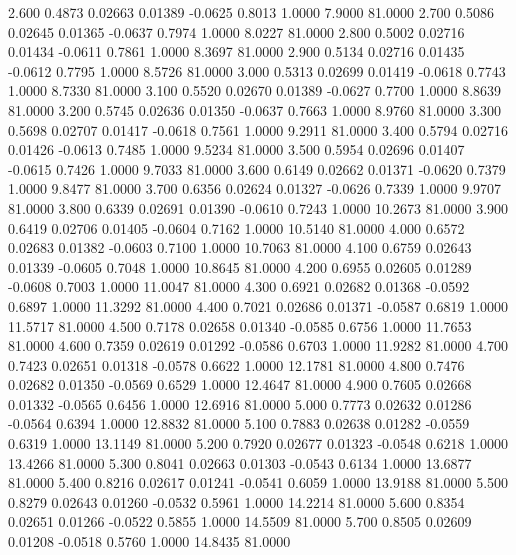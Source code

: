   2.600   0.4873   0.02663   0.01389  -0.0625   0.8013   1.0000   7.9000  81.0000
   2.700   0.5086   0.02645   0.01365  -0.0637   0.7974   1.0000   8.0227  81.0000
   2.800   0.5002   0.02716   0.01434  -0.0611   0.7861   1.0000   8.3697  81.0000
   2.900   0.5134   0.02716   0.01435  -0.0612   0.7795   1.0000   8.5726  81.0000
   3.000   0.5313   0.02699   0.01419  -0.0618   0.7743   1.0000   8.7330  81.0000
   3.100   0.5520   0.02670   0.01389  -0.0627   0.7700   1.0000   8.8639  81.0000
   3.200   0.5745   0.02636   0.01350  -0.0637   0.7663   1.0000   8.9760  81.0000
   3.300   0.5698   0.02707   0.01417  -0.0618   0.7561   1.0000   9.2911  81.0000
   3.400   0.5794   0.02716   0.01426  -0.0613   0.7485   1.0000   9.5234  81.0000
   3.500   0.5954   0.02696   0.01407  -0.0615   0.7426   1.0000   9.7033  81.0000
   3.600   0.6149   0.02662   0.01371  -0.0620   0.7379   1.0000   9.8477  81.0000
   3.700   0.6356   0.02624   0.01327  -0.0626   0.7339   1.0000   9.9707  81.0000
   3.800   0.6339   0.02691   0.01390  -0.0610   0.7243   1.0000  10.2673  81.0000
   3.900   0.6419   0.02706   0.01405  -0.0604   0.7162   1.0000  10.5140  81.0000
   4.000   0.6572   0.02683   0.01382  -0.0603   0.7100   1.0000  10.7063  81.0000
   4.100   0.6759   0.02643   0.01339  -0.0605   0.7048   1.0000  10.8645  81.0000
   4.200   0.6955   0.02605   0.01289  -0.0608   0.7003   1.0000  11.0047  81.0000
   4.300   0.6921   0.02682   0.01368  -0.0592   0.6897   1.0000  11.3292  81.0000
   4.400   0.7021   0.02686   0.01371  -0.0587   0.6819   1.0000  11.5717  81.0000
   4.500   0.7178   0.02658   0.01340  -0.0585   0.6756   1.0000  11.7653  81.0000
   4.600   0.7359   0.02619   0.01292  -0.0586   0.6703   1.0000  11.9282  81.0000
   4.700   0.7423   0.02651   0.01318  -0.0578   0.6622   1.0000  12.1781  81.0000
   4.800   0.7476   0.02682   0.01350  -0.0569   0.6529   1.0000  12.4647  81.0000
   4.900   0.7605   0.02668   0.01332  -0.0565   0.6456   1.0000  12.6916  81.0000
   5.000   0.7773   0.02632   0.01286  -0.0564   0.6394   1.0000  12.8832  81.0000
   5.100   0.7883   0.02638   0.01282  -0.0559   0.6319   1.0000  13.1149  81.0000
   5.200   0.7920   0.02677   0.01323  -0.0548   0.6218   1.0000  13.4266  81.0000
   5.300   0.8041   0.02663   0.01303  -0.0543   0.6134   1.0000  13.6877  81.0000
   5.400   0.8216   0.02617   0.01241  -0.0541   0.6059   1.0000  13.9188  81.0000
   5.500   0.8279   0.02643   0.01260  -0.0532   0.5961   1.0000  14.2214  81.0000
   5.600   0.8354   0.02651   0.01266  -0.0522   0.5855   1.0000  14.5509  81.0000
   5.700   0.8505   0.02609   0.01208  -0.0518   0.5760   1.0000  14.8435  81.0000
